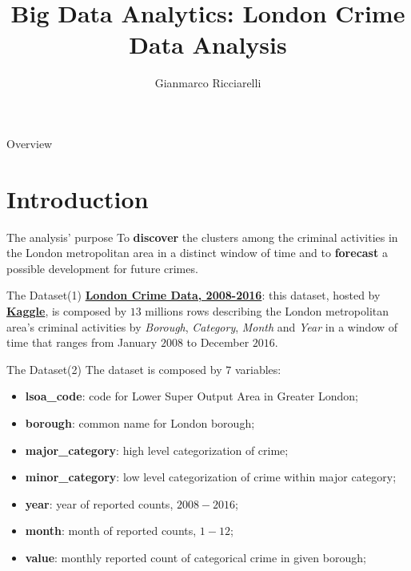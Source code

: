 \documentclass[12pt]{beamer}
\title{Big Data Analytics: London Crime Data Analysis}
\author{Gianmarco Ricciarelli\inst{1}}
\institute{\inst{1}University of Pisa, \\
           \email{gianmarcoricciarelli@gmail.com}}
\date{}
\begin{document}
    \maketitle

    \begin{frame}{Overview}
        \tableofcontents
    \end{frame}

    \section{Introduction} %
    \label{sec:introduction}
        \begin{frame}{The analysis' purpose}
            To \textbf{discover} the clusters among the criminal activities in the London metropolitan area
            in a distinct window of time and to \textbf{forecast} a possible development for future crimes.
        \end{frame}

        \begin{frame}{The Dataset(1)}
            \href{https://www.kaggle.com/jboysen/london-crime}{\textbf{London Crime Data, 2008-2016}}: this
            dataset, hosted by \href{https://www.kaggle.com}{\textbf{Kaggle}}, is composed by $13$
            millions rows describing the London metropolitan area's criminal activities by \textit{Borough},
            \textit{Category}, \textit{Month} and \textit{Year} in a window of time that ranges from
            January $2008$ to December $2016$.
        \end{frame}

        \begin{frame}{The Dataset(2)}
            The dataset is composed by $7$ variables:

            \begin{itemize}
                \item \textbf{lsoa\_code}: code for Lower Super Output Area in Greater London;
                \item \textbf{borough}: common name for London borough;
                \item \textbf{major\_category}: high level categorization of crime;
                \item \textbf{minor\_category}: low level categorization of crime within major category;
                \item \textbf{year}: year of reported counts, $2008-2016$;
                \item \textbf{month}: month of reported counts, $1-12$;
                \item \textbf{value}: monthly reported count of categorical crime in given borough;
            \end{itemize}
        \end{frame}
\end{document}
